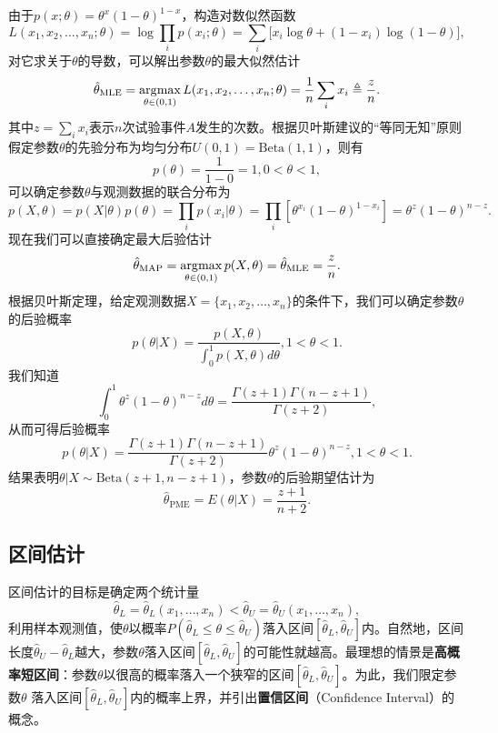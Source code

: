 \begin{solu}
由于$p(x;\theta)=\theta^x (1-\theta)^{1-x}$，构造对数似然函数
\[
    L(x_1,x_2,\ldots,x_n;\theta) = \log\prod\limits_i p(x_i;\theta) = \sum\limits_i \big[x_i \log \theta + (1-x_i)\log(1-\theta)\big],
\]
对它求关于$\theta$的导数，可以解出参数$\theta$的最大似然估计
\begin{equation}
    \hat\theta_\mathrm{MLE} = \operatorname*{\mathrm{\arg\!\max}}\limits_{\theta\in (0,1)}L(x_1,x_2,\ldots,x_n;\theta) = \frac{1}{n} \sum\limits_i x_i \triangleq \frac{z}{n}.
\end{equation}
其中$z=\sum\limits_i x_i$表示$n$次试验事件$A$发生的次数。根据贝叶斯建议的“等同无知”原则假定参数$\theta$的先验分布为均匀分布$U(0,1)=\mathrm{Beta}(1,1)$，则有
\[
    p(\theta) = \frac{1}{1-0} = 1, 0<\theta<1,
\]
可以确定参数$\theta$与观测数据的联合分布为
\[
    p(X,\theta) = p(X|\theta) p(\theta) = \prod\limits_i p(x_i|\theta) = \prod\limits_i [\theta^{x_i} (1-\theta)^{1-x_i}] = \theta^z (1-\theta)^{n -z}.
\]
现在我们可以直接确定最大后验估计
\begin{equation}
    \hat\theta_\mathrm{MAP} = \operatorname*{\mathrm{\arg\!\max}}\limits_{\theta\in (0,1)} p(X,\theta) = \hat\theta_\mathrm{MLE} = \frac{z}{n}.
\end{equation}
根据贝叶斯定理，给定观测数据$X=\{x_1,x_2,\ldots,x_n\}$的条件下，我们可以确定参数$\theta$的后验概率
\[
    p(\theta|X) = \frac{p(X,\theta)}{\int_0^1 p(X,\theta) d\theta}, 1<\theta < 1.
\]
我们知道
\[
    \int_0^1 \theta^z (1-\theta)^{n-z} d\theta = \frac{\Gamma(z+1)\Gamma(n-z+1)}{\Gamma(z+2)},
\]
从而可得后验概率
\[
    p(\theta|X) = \frac{\Gamma(z+1)\Gamma(n-z+1)}{\Gamma(z+2)} \theta^z (1-\theta)^{n -z}, 1<\theta < 1.
\]
结果表明$\theta|X\sim \mathrm{Beta}(z+1,n-z+1)$，参数$\theta$的后验期望估计为
\begin{equation}
    \hat\theta_\mathrm{PME} = E(\theta|X) = \frac{z+1}{n+2}.
\end{equation}
\end{solu}

\subsection{区间估计}
区间估计的目标是确定两个统计量
\[
    \hat \theta_L=\hat\theta_L(x_1,\ldots,x_n) < \hat \theta_U=\hat\theta_U(x_1,\ldots,x_n),
\]
利用样本观测值，使$\theta$以概率$P(\hat\theta_L \le \theta \le \hat\theta_U)$落入区间$[\hat\theta_L,\hat\theta_U]$内。自然地，区间长度$\hat\theta_U-\hat\theta_L$越大，参数$\theta$落入区间$[\hat\theta_L,\hat\theta_U]$的可能性就越高。最理想的情景是\textbf{高概率短区间}：参数$\theta$以很高的概率落入一个狭窄的区间$[\hat\theta_L,\hat\theta_U]$。为此，我们限定参数$\theta$ 落入区间$[\hat\theta_L,\hat\theta_U]$内的概率上界，并引出\textbf{置信区间}（Confidence Interval）的概念。

